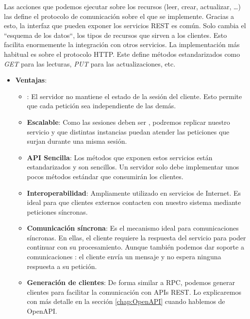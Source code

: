 Las acciones que podemos ejecutar sobre los recursos (leer, crear, actualizar, \dots) las define el protocolo de comunicación sobre el que se implemente. Gracias a esto, la interfaz que pueden exponer los servicios REST es común. Solo cambia el ``esquema de los datos``, los tipos de recursos que sirven a los clientes. Esto facilita enormemente la integración con otros servicios. \cite{nallyRESTVsRPC2018} La implementación más habitual es sobre el protocolo HTTP. Este define métodos estandarizados como \emph{GET} para las lecturas, \emph{PUT} para las actualizaciones, etc.

\begin{itemize}
  \item \textbf{Ventajas}:

  \begin{itemize}
    \item \textbf{}: El servidor no mantiene el estado de la sesión del cliente. Esto permite que cada petición sea independiente de las demás.

    \item \textbf{Escalable}: Como las sesiones deben ser , podremos replicar nuestro servicio y que distintas instancias puedan atender las peticiones que surjan durante una misma sesión.

    \item \textbf{API Sencilla}: Los métodos que exponen estos servicios están estandarizados y son sencillos. Un servidor solo debe implementar unos pocos métodos estándar que consumirán los clientes.

    \item \textbf{Interoperabilidad}: Ampliamente utilizado en servicios de Internet. Es ideal para que clientes externos contacten con nuestro sistema mediante peticiones síncronas. \cite{newmanBuildingMicroservicesDesigning2021}

    \item \textbf{Comunicación síncrona}: Es el mecanismo ideal para comunicaciones síncronas. En ellas, el cliente requiere la respuesta del servicio para poder continuar con su procesamiento. Aunque también podemos dar soporte a comunicaciones : el cliente envía un mensaje y no espera ninguna respuesta a su petición.

    \item \textbf{Generación de clientes}: De forma similar a RPC, podemos generar clientes para facilitar la comunicación con APIs REST. Lo explicaremos con más detalle en la sección \ref{chap:OpenAPI} cuando hablemos de OpenAPI.
  \end{itemize}


\end{itemize}

